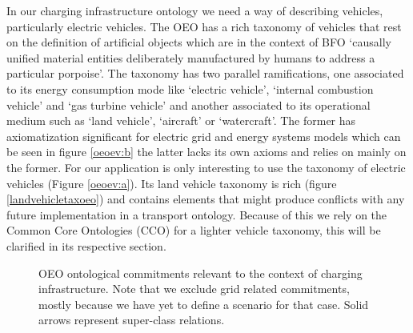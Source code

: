 In our charging infrastructure ontology we need a way of describing vehicles,
particularly electric vehicles. The OEO has a rich taxonomy of vehicles that
rest on the definition of artificial objects which are in the context of BFO
`causally unified material entities deliberately manufactured by humans to
address a particular porpoise'. The taxonomy has two parallel ramifications,
one associated to its energy consumption mode like `electric vehicle',
`internal combustion vehicle' and `gas turbine vehicle' and another associated
to its operational medium such as `land vehicle', `aircraft' or `watercraft'.
The former has axiomatization significant for electric grid and energy systems
models which can be seen in figure \ref{oeoev:b} the latter lacks its own
axioms and relies on mainly on the former. For our application is only
interesting to use the taxonomy of electric vehicles (Figure \ref{oeoev:a}).
Its land vehicle taxonomy is rich (figure \ref{landvehicletaxoeo}) and contains
elements that might produce conflicts with any future implementation in a
transport ontology. Because of this we rely on the Common Core Ontologies (CCO)
for a lighter vehicle taxonomy, this will be clarified in its respective
section.

\begin{figure}
    \centering
    \caption{OEO ontological commitments relevant to the context of charging infrastructure. Note that we exclude grid related commitments, mostly because we have yet to define a scenario for that case. Solid arrows represent super-class relations.}
\end{figure}

